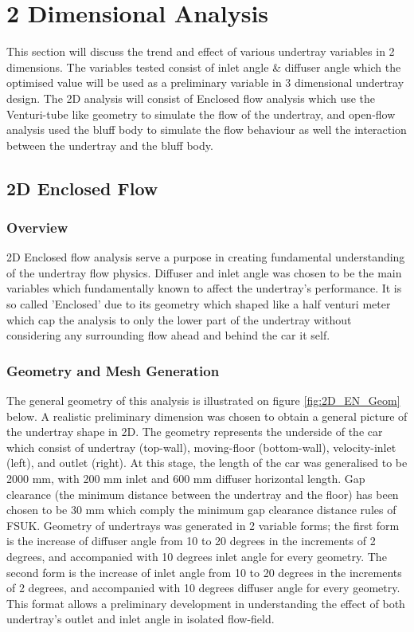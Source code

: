 \newpage
\section{2 Dimensional Analysis}
This section will discuss the trend and effect of various undertray variables in 2 dimensions. The variables tested consist of inlet angle \& diffuser angle which the optimised value will be used as a preliminary variable in 3 dimensional undertray design. The 2D analysis will consist of Enclosed flow analysis which use the Venturi-tube like geometry to simulate the flow of the undertray, and open-flow analysis used the bluff body to simulate the flow behaviour as well the interaction between the undertray and the bluff body. 

\subsection{2D Enclosed Flow}
\subsubsection{Overview}
2D Enclosed flow analysis serve a purpose in creating fundamental understanding of the undertray flow physics. Diffuser and inlet angle was chosen to be the main variables which fundamentally known to affect the undertray's performance. It is so called 'Enclosed' due to its geometry which shaped like a half venturi meter which cap the analysis to only the lower part of the undertray without considering any surrounding flow ahead and behind the car it self.  %

\subsubsection{Geometry and Mesh Generation}
\noindent The general geometry of this analysis is illustrated on figure \ref{fig:2D_EN_Geom} below. A realistic preliminary dimension was chosen to obtain a general picture of the undertray shape in 2D. The geometry represents the underside of the car which consist of undertray (top-wall), moving-floor (bottom-wall), velocity-inlet (left), and outlet (right). At this stage, the length of the car was generalised to be 2000 mm, with 200 mm inlet and 600 mm diffuser horizontal length. Gap clearance (the minimum distance between the undertray and the floor) has been chosen to be 30 mm which comply the minimum gap clearance distance rules of FSUK. Geometry of undertrays was generated in 2 variable forms; the first form is the increase of diffuser angle from 10 to 20 degrees in the increments of 2 degrees, and accompanied with 10 degrees inlet angle for every geometry. The second form is the increase of inlet angle from 10 to 20 degrees in the increments of 2 degrees, and accompanied with 10 degrees diffuser angle for every geometry. This format allows a preliminary development in understanding the effect of both undertray's outlet and inlet angle in isolated flow-field. 

